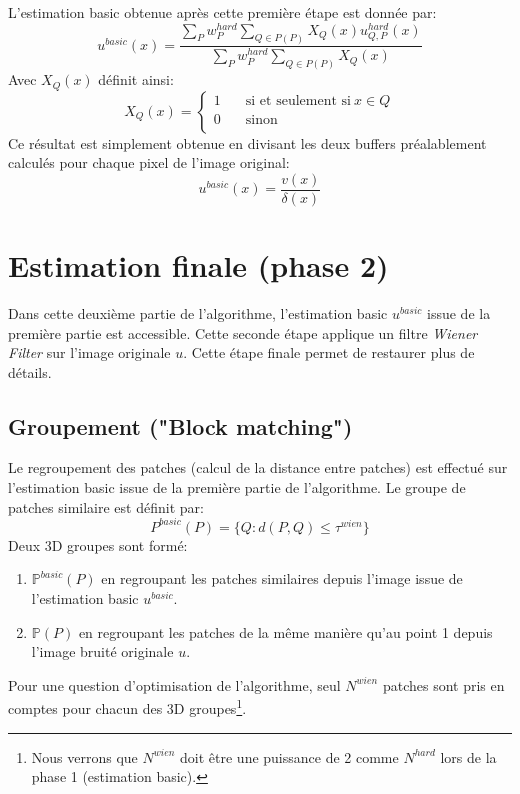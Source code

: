 \newline 
\newline
L'estimation basic obtenue après cette première étape est donnée par:
\begin{equation}
u^{basic}(x) = \frac{\displaystyle\sum_{P}w^{hard}_P \displaystyle\sum_{Q \in P(P)}X_Q(x)u^{hard}_{Q,P}(x)}{\displaystyle\sum_{P}w^{hard}_P \displaystyle\sum_{Q \in P(P)}X_Q(x)}
\end{equation}
Avec \(X_Q(x)\) définit ainsi:
\[ X_Q(x) =
  \begin{cases}
    1       & \quad \text{si et seulement si} \: x  \in Q \\
    0       & \quad \text{sinon}\\
  \end{cases}
\]
Ce résultat est simplement obtenue en divisant les deux buffers préalablement calculés pour chaque pixel de l'image original: 
\begin{equation}
u^{basic}(x) = \frac{v(x)}{\delta(x)}
\end{equation}
\newpage

\section{Estimation finale (phase 2)}
Dans cette deuxième partie de l'algorithme, l'estimation basic \(u^{basic} \) issue de la première partie est accessible. Cette seconde étape applique un filtre \textit{Wiener Filter} sur l'image originale \(u \). Cette étape finale permet de restaurer plus de détails. 
\subsection{Groupement ("Block matching")}
Le regroupement des patches (calcul de la distance entre patches) est effectué sur l'estimation basic issue de la première partie de l'algorithme. Le groupe de patches similaire est définit par:
\begin{equation}
P^{basic}(P) = \{ Q: d(P,Q) \leq \tau^{wien} \}
\end{equation}
Deux 3D groupes sont formé:
 \begin{enumerate}
\item \(\mathbb{P}^{basic}(P) \) en regroupant les patches similaires  depuis l'image issue de l'estimation basic \(u^{basic}\).
\item \(\mathbb{P}(P)\) en regroupant les patches de la même manière qu'au point 1 depuis l'image bruité originale \(u\).
\end{enumerate}
Pour une question d'optimisation de l'algorithme, seul \(N^{wien} \) patches sont pris en comptes pour chacun des 3D groupes\footnote{Nous verrons que \(N^{wien} \) doit être une puissance de 2 comme \(N^{hard} \) lors de la phase 1 (estimation basic).}.
